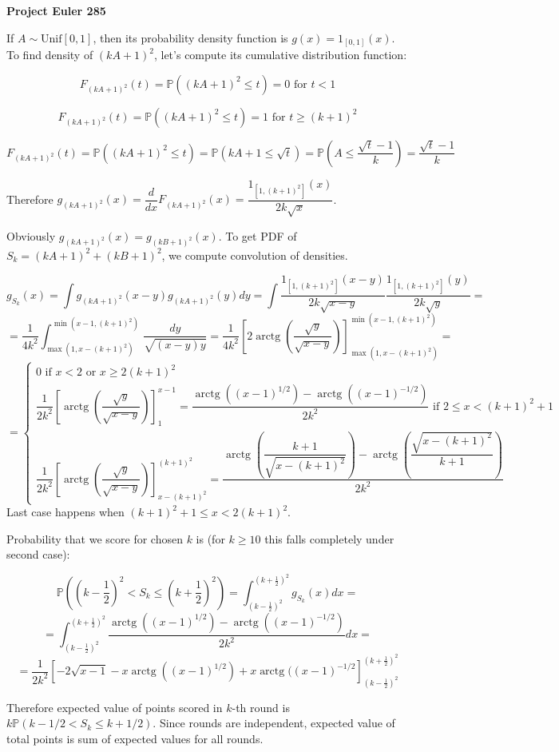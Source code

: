 \documentclass[a4paper,12pt]{article}
\newcommand{\arctg}{\operatorname{arctg}}
\begin{document}
\setlength\parindent{0pt}
\textbf{Project Euler 285}
\vspace{5ex}

If \(A \sim \text{Unif}[0, 1]\), then its probability density function is \(g(x) = 1_{[0, 1]}(x)\). To find density of \((kA+1)^2\), let's compute its cumulative distribution function:

\[F_{(kA + 1)^2}(t) = \mathbb{P}((kA + 1)^2 \leq t) = 0 \text{ for } t < 1\]

\[F_{(kA + 1)^2}(t) = \mathbb{P}((kA + 1)^2 \leq t) = 1 \text{ for } t \geq (k + 1)^2\]

\[F_{(kA + 1)^2}(t) = \mathbb{P}((kA + 1)^2 \leq t) = \mathbb{P}(kA + 1 \leq \sqrt{t}) = \mathbb{P}\left(A \leq \frac{\sqrt{t} - 1}{k}\right) = \frac{\sqrt{t} - 1}{k}\]

Therefore \(g_{(kA + 1)^2}(x) = \dfrac{d}{dx} F_{(kA + 1)^2}(x) = \dfrac{1_{[1, (k + 1)^2]}(x)}{2k\sqrt{x}}\).

Obviously \(g_{(kA + 1)^2}(x) = g_{(kB + 1)^2}(x)\). To get PDF of \(S_k = (kA + 1)^2 + (kB + 1)^2\), we compute convolution of densities.

\[g_{S_k}(x) = \int g_{(kA + 1)^2}(x - y) g_{(kA + 1)^2}(y) dy = \int  \frac{1_{[1, (k + 1)^2]}(x - y)}{2k\sqrt{x - y}} \frac{1_{[1, (k + 1)^2]}(y)}{2k\sqrt{y}} =\]
\[= \frac{1}{4k^2} \int_{\max(1, x - (k + 1)^2)}^{\min(x - 1, (k + 1)^2)} \frac{dy}{\sqrt{(x - y)y}} = \frac{1}{4k^2} \left[2\arctg\left(\frac{\sqrt{y}}{\sqrt{x - y}}\right)\right]_{\max(1, x - (k + 1)^2)}^{\min(x - 1, (k + 1)^2)} =\]
\[ =
\begin{cases}
0 \text{ if } x < 2 \text{ or } x \geq 2(k + 1)^2
\\
\dfrac{1}{2k^2} \left[\arctg\left(\dfrac{\sqrt{y}}{\sqrt{x - y}}\right)\right]_{1}^{x - 1} = \dfrac{\arctg((x - 1)^{1/2}) - \arctg((x - 1)^{-1/2})}{2k^2} \text{ if } 2 \leq x < (k+1)^2 + 1\\
\dfrac{1}{2k^2} \left[\arctg\left(\dfrac{\sqrt{y}}{\sqrt{x - y}}\right)\right]_{x - (k + 1)^2}^{(k + 1)^2} = \dfrac{\arctg\left(\dfrac{k + 1}{\sqrt{x - (k + 1)^2}}\right) - \arctg\left(\dfrac{\sqrt{x - (k + 1)^2}}{k + 1}\right)}{2k^2}
\end{cases}\]
Last case happens when \((k+1)^2 + 1 \leq x < 2(k + 1)^2\).

Probability that we score for chosen \(k\) is (for \(k \geq 10\) this falls completely under second case):

\[\mathbb{P}\left(\left(k - \dfrac{1}{2}\right)^2 < S_k \leq \left(k + \dfrac{1}{2}\right)^2\right) = \int_{(k - \frac{1}{2})^2}^{(k + \frac{1}{2})^2} g_{S_k}(x)dx = \] \[= \int_{(k - \frac{1}{2})^2}^{(k + \frac{1}{2})^2} \dfrac{\arctg((x - 1)^{1/2}) - \arctg((x - 1)^{-1/2})}{2k^2}dx =\]
\[=\frac{1}{2k^2} \left[ -2\sqrt{x - 1} - x \arctg((x - 1)^{1/2}) + x\arctg((x - 1)^{-1/2}\right]_{(k - \frac{1}{2})^2}^{(k + \frac{1}{2})^2}\]

Therefore expected value of points scored in \(k\)-th round is \(k\mathbb{P}(k - 1/2 < S_k \leq k + 1/2)\). Since rounds are independent, expected value of total points is sum of expected values for all rounds.
\end{document}
